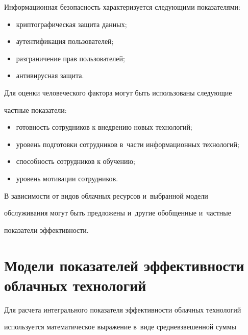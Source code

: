   

  Информационная безопасность характеризуется следующими показателями:

  \begin{itemize}

  \item криптографическая защита данных;

  \item аутентификация пользователей; 

  \item разграничение прав пользователей;

  \item антивирусная защита.

  \end{itemize}

  

  Для оценки человеческого фактора могут быть использованы следующие 

частные показатели:

  \begin{itemize}

  \item готовность сотрудников к внедрению новых технологий;

  \item уровень подготовки сотрудников в~части информационных тех\-но\-ло\-гий;

  \item способность сотрудников к обучению;

  \item уровень мотивации сотрудников.

  \end{itemize}

  

  В зависимости от видов облачных ресурсов и~выбранной модели 

обслуживания могут быть предложены и~другие обобщенные и~частные 

показатели эффективности.



\section{Модели показателей эффективности облачных технологий}



  Для расчета интегрального показателя эффективности облачных технологий 

используется математическое выражение в~виде средневзвешенной суммы 

